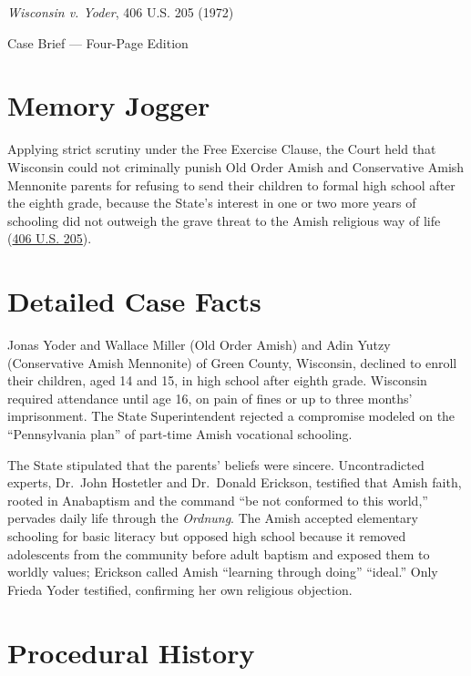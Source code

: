 \documentclass[12pt]{article}
\begin{document}
\begin{center}
{\LARGE \textit{Wisconsin v. Yoder}, 406 U.S. 205 (1972)\par}
\vspace{0.8em}
{\large Case Brief --- Four-Page Edition\par}
\end{center}
\vspace{1em}

\section{Memory Jogger}

Applying strict scrutiny under the Free Exercise Clause, the Court held that Wisconsin could not criminally punish Old Order Amish and Conservative Amish Mennonite parents for refusing to send their children to formal high school after the eighth grade, because the State's interest in one or two more years of schooling did not outweigh the grave threat to the Amish religious way of life (\href{https://supreme.justia.com/cases/federal/us/406/205/}{406 U.S. 205}).

\section{Detailed Case Facts}

Jonas Yoder and Wallace Miller (Old Order Amish) and Adin Yutzy (Conservative Amish Mennonite) of Green County, Wisconsin, declined to enroll their children, aged 14 and 15, in high school after eighth grade. Wisconsin required attendance until age 16, on pain of fines or up to three months' imprisonment. The State Superintendent rejected a compromise modeled on the ``Pennsylvania plan'' of part-time Amish vocational schooling.

The State stipulated that the parents' beliefs were sincere. Uncontradicted experts, Dr.\ John Hostetler and Dr.\ Donald Erickson, testified that Amish faith, rooted in Anabaptism and the command ``be not conformed to this world,'' pervades daily life through the \emph{Ordnung}. The Amish accepted elementary schooling for basic literacy but opposed high school because it removed adolescents from the community before adult baptism and exposed them to worldly values; Erickson called Amish ``learning through doing'' ``ideal.'' Only Frieda Yoder testified, confirming her own religious objection.

\section{Procedural History}
\end{document}

